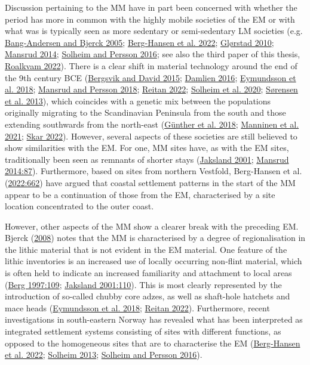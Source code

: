 \documentclass[
  12pt,
  a4paper,
  oneside]{book}
\begin{document}
Discussion pertaining to the MM have in part been concerned with whether the period has more in common with the highly mobile societies of the EM or with what was is typically seen as more sedentary or semi-sedentary LM societies (e.g. \protect\hyperlink{ref-bang-andersen2005}{Bang-Andersen and Bjerck 2005}; \protect\hyperlink{ref-berg-hansen2022}{Berg-Hansen et al. 2022}; \protect\hyperlink{ref-glorstad2010}{Glørstad 2010}; \protect\hyperlink{ref-mansrud2014}{Mansrud 2014}; \protect\hyperlink{ref-solheim2016}{Solheim and Persson 2016}; see also the third paper of this thesis, \protect\hyperlink{ref-roalkvam2022}{Roalkvam 2022}). There is a clear shift in material technology around the end of the 9th century BCE (\protect\hyperlink{ref-bergsvik2015}{Bergsvik and David 2015}; \protect\hyperlink{ref-damlien2016}{Damlien 2016}; \protect\hyperlink{ref-eymundsson2018}{Eymundsson et al. 2018}; \protect\hyperlink{ref-mansrud2018}{Mansrud and Persson 2018}; \protect\hyperlink{ref-reitan2022}{Reitan 2022}; \protect\hyperlink{ref-solheim2020a}{Solheim et al. 2020}; \protect\hyperlink{ref-suxf8rensen2013}{Sørensen et al. 2013}), which coincides with a genetic mix between the populations originally migrating to the Scandinavian Peninsula from the south and those extending southwards from the north-east (\protect\hyperlink{ref-gunther2018}{Günther et al. 2018}; \protect\hyperlink{ref-manninen2021}{Manninen et al. 2021}; \protect\hyperlink{ref-skar2022}{Skar 2022}). However, several aspects of these societies are still believed to show similarities with the EM. For one, MM sites have, as with the EM sites, traditionally been seen as remnants of shorter stays (\protect\hyperlink{ref-jaksland2001}{Jaksland 2001}; \protect\hyperlink{ref-mansrud2014}{Mansrud 2014:87}). Furthermore, based on sites from northern Vestfold, Berg-Hansen et al. (\protect\hyperlink{ref-berg-hansen2022}{2022:662}) have argued that coastal settlement patterns in the start of the MM appear to be a continuation of those from the EM, characterised by a site location concentrated to the outer coast.

However, other aspects of the MM show a clearer break with the preceding EM. Bjerck (\protect\hyperlink{ref-bjerck2008}{2008}) notes that the MM is characterised by a degree of regionalisation in the lithic material that is not evident in the EM material. One feature of the lithic inventories is an increased use of locally occurring non-flint material, which is often held to indicate an increased familiarity and attachment to local areas (\protect\hyperlink{ref-berg1997}{Berg 1997:109}; \protect\hyperlink{ref-jaksland2001}{Jaksland 2001:110}). This is most clearly represented by the introduction of so-called chubby core adzes, as well as shaft-hole hatchets and mace heads (\protect\hyperlink{ref-eymundsson2018}{Eymundsson et al. 2018}; \protect\hyperlink{ref-reitan2022}{Reitan 2022}). Furthermore, recent investigations in south-eastern Norway has revealed what has been interpreted as integrated settlement systems consisting of sites with different functions, as opposed to the homogeneous sites that are to characterise the EM (\protect\hyperlink{ref-berg-hansen2022}{Berg-Hansen et al. 2022}; \protect\hyperlink{ref-solheim2013b}{Solheim 2013}; \protect\hyperlink{ref-solheim2016}{Solheim and Persson 2016}).
\end{document}
